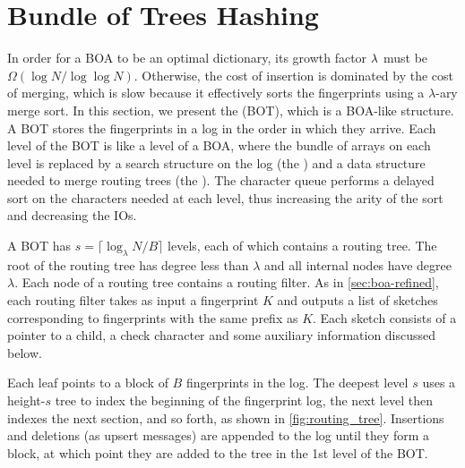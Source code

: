 \section{Bundle of Trees Hashing}\label{sec:boa-bot}

\sloppy
In order for a BOA to be an optimal dictionary, its growth factor $\lambda{}$
must be $\Omega(\log{N}/\log\log{N})$. Otherwise, the cost of insertion is
dominated by the cost of merging, which is slow because it effectively sorts
the fingerprints using a $\lambda$-ary merge sort. In this section, we present
the  (BOT), which is a BOA-like structure. A
BOT stores the fingerprints in a log in the order in which they arrive. Each
level of the BOT is like a level of a BOA, where the bundle of arrays on each
level is replaced by a search structure on the log (the )
and a data structure needed to merge routing trees (the ).  The character queue performs a delayed sort on the characters needed
at each level, thus increasing the arity of the sort and decreasing the IOs.

\fussy
A BOT has $s = \lceil \log_\lambda N/B \rceil$ levels, each of which contains a
routing tree. The root of the routing tree has degree less than $\lambda$ and
all internal nodes have degree $\lambda$. Each node of a routing tree contains
a routing filter. As in \cref{sec:boa-refined}, each routing filter takes as
input a fingerprint $K$ and outputs a list of sketches corresponding to
fingerprints with the same prefix as $K$. Each sketch consists of a pointer to
a child, a check character and some auxiliary information discussed below.

Each leaf points to a block of $B$ fingerprints in the log. The deepest level
$s$ uses a height-$s$ tree to index the beginning of the fingerprint log, the
next level then indexes the next section, and so forth, as shown in
\cref{fig:routing_tree}. Insertions and deletions (as upsert messages) are
appended to the log until they form a block, at which point they are added to
the tree in the 1st level of the BOT.

